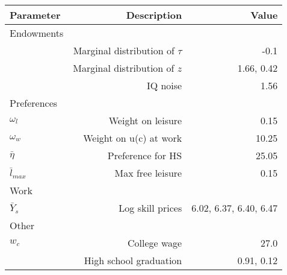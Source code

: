 \begin{tabular}{lrr}
\hline
Parameter & Description  & Value  \\ 
\hline
Endowments &   &   \\ 
 & Marginal distribution of $\tau$  & -0.1  \\ 
 & Marginal distribution of $z$  & 1.66, 0.42  \\ 
 & IQ noise  & 1.56  \\ 
Preferences &   &   \\ 
$\omega_{l}$ & Weight on leisure  & 0.15  \\ 
$\omega_{w}$ & Weight on u(c) at work  & 10.25  \\ 
$\bar{\eta}$ & Preference for HS  & 25.05  \\ 
$\bar{l}_{max}$ & Max free leisure  & 0.15  \\ 
Work &   &   \\ 
$\bar{Y}_{s}$ & Log skill prices  & 6.02, 6.37, 6.40, 6.47  \\ 
Other &   &   \\ 
$w_{c}$ & College wage  & 27.0  \\ 
 & High school graduation  & 0.91, 0.12  \\ 
\hline
\end{tabular}%
